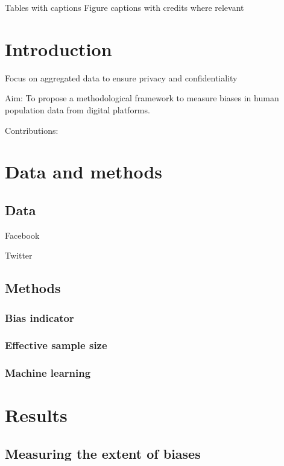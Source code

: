 \documentclass[]{rsos}%
\begin{document}
Tables with captions Figure captions with credits where relevant

\newpage

\section{Introduction}\label{introduction}

Focus on aggregated data to ensure privacy and confidentiality

Aim: To propose a methodological framework to measure biases in human population data from digital platforms.

Contributions:

\section{Data and methods}\label{data-and-methods}

\subsection{Data}\label{data}

Facebook

Twitter

\subsection{Methods}\label{methods}

\subsubsection{Bias indicator}\label{bias-indicator}

\subsubsection{Effective sample size}\label{effective-sample-size}

\subsubsection{Machine learning}\label{machine-learning}

\section{Results}\label{results}

\subsection{Measuring the extent of biases}\label{measuring-the-extent-of-biases}
\end{document}
